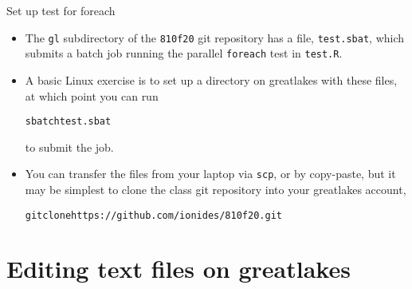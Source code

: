 \begin{frame}[fragile]{Set up test for foreach} 

\begin{itemize}
\item
The \texttt{gl} subdirectory of the \texttt{810f20} git repository has a file, \texttt{test.sbat}, which submits a batch job running the parallel \texttt{foreach} test in \texttt{test.R}.
\item
A basic Linux exercise is to set up a directory on greatlakes with these files, at which point you can run
\begin{knitrout}\small
{}\color{fgcolor}\begin{kframe}
\begin{alltt}
sbatch test.sbat
\end{alltt}
\end{kframe}
\end{knitrout}
to submit the job.
\item You can transfer the files from your laptop via \texttt{scp}, or by copy-paste, but it may be simplest to clone the class git repository into your greatlakes account,
\begin{knitrout}\small
{}\color{fgcolor}\begin{kframe}
\begin{alltt}
git clone https://github.com/ionides/810f20.git
\end{alltt}
\end{kframe}
\end{knitrout}
\end{itemize}

\end{frame}

\section{Editing text files on greatlakes}

